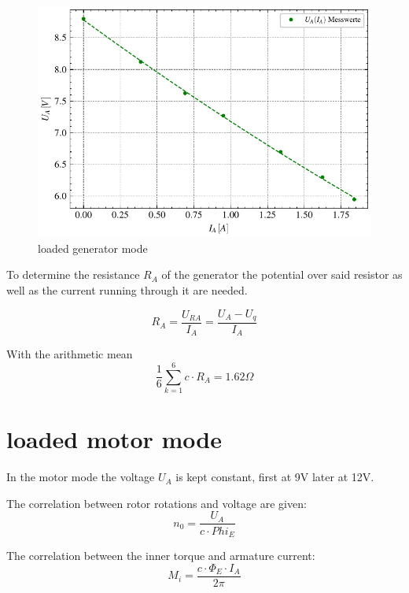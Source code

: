\documentclass[conference]{IEEEtran}
\begin{document}
\begin{figure}[htbp]
    \centering
    \includegraphics[width=\columnwidth]{plots/4.2_Belasteter_Generator_4000.pdf}
    \caption{loaded generator mode}
    \label{fig:load_generator_mode}
\end{figure}

To determine the resistance $R_A$ of the generator the potential over said
resistor as well as the current running through it are needed.

\begin{equation} \label{eq:R_A_resistance}
    R_A = \frac{U_{RA}}{I_A} = \frac{U_A - U_q}{I_A}
\end{equation}

With the arithmetic mean
\begin{equation}
    \frac{1}{6} \sum\limits_{k = 1}^{6} c \cdot R_A = 1.62 \Omega
\end{equation}


\section{loaded motor mode}
In the motor mode the voltage $U_A$ is kept constant, first at 9V later at 12V.

The correlation between rotor rotations and voltage are given:
\begin{equation}
    n_0 = \frac{U_A}{c \cdot Phi_E}
\end{equation}

The correlation between the inner torque and armature current:
\begin{equation}
    M_i = \frac{c \cdot \Phi_E \cdot I_A}{2 \pi}
\end{equation}
\end{document}
